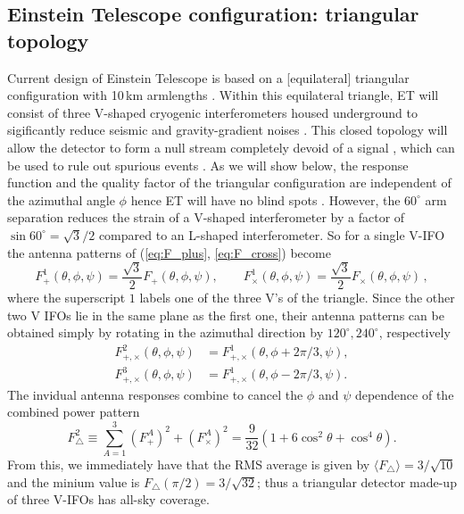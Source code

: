 \documentclass[11pt,a4paper]{article}
\newcommand{\f}{\frac}
\newcommand{\be}{\begin{equation}}
\newcommand{\ee}{\end{equation}}
\begin{document}
\subsection{Einstein Telescope configuration: triangular topology}\label{sec:ET_topo}
Current design of Einstein Telescope is based on a [equilateral] triangular configuration with 10\,km armlengths \cite{ET_doc}.
Within this equilateral triangle, ET will consist of three V-shaped cryogenic interferometers housed underground to
sigificantly reduce seismic and gravity-gradient noises \cite{ET_doc}.
This closed topology will allow the detector to form a null stream completely devoid of a signal \cite{Sathyaprakash:2012jk},
which can be used to rule out spurious events \cite{Wen:2005ui}.
As we will show below, the response function and the quality factor of the triangular configuration are independent of the azimuthal angle $\phi$
hence ET will have no blind spots \cite{Regimbau:2012ir}.
However, the $60^\circ$ arm separation reduces the strain of a V-shaped interferometer by a factor of $\sin 60^\circ=\sqrt{3}/2$ compared
to an L-shaped interferometer. So for a single V-IFO the antenna patterns of (\ref{eq:F_plus}, \ref{eq:F_cross}) become
%
\be
F^1_+(\theta,\phi,\psi)= \f{\sqrt{3}}{2} F_+(\theta,\phi,\psi), \qquad F^1_\times(\theta,\phi,\psi)= \f{\sqrt{3}}{2} F_\times(\theta,\phi,\psi)\label{eq:F1plus_F1cross}\, ,
\ee
%
where the superscript $1$ labels one of the three V's of the triangle.
Since the other two V IFOs lie in the same plane as the first one, their antenna patterns can be obtained simply by rotating in the azimuthal
direction by $120^\circ, 240^\circ$, respectively
%
\begin{align}
 F^2_{+,\times}(\theta,\phi,\psi) &= F^1_{+,\times}(\theta,\phi+2\pi/3,\psi), \label{eq:F2plus_F2cross}\\
 F^3_{+,\times}(\theta,\phi,\psi) &= F^1_{+,\times}(\theta,\phi-2\pi/3,\psi) \label{eq:F3plus_F3cross}.
\end{align}
%
The invidual antenna responses combine to cancel the $\phi$ and $\psi$ dependence of the combined power pattern
%
\be
F^2_\bigtriangleup \equiv \sum_{A=1}^3 \left(F^A_+\right)^2+\left(F^A_\times\right)^2 = \f{9}{32}\left(1+6\cos^2\theta + \cos^4\theta\right). \label{eq:ET_power_pattern}
\ee
%
From this, we immediately have that the RMS average is given by $\langle F_\bigtriangleup\rangle =3/\sqrt{10}$ and the minium value is $F_\bigtriangleup(\pi/2)=3/\sqrt{32}$;
thus a triangular detector made-up of three V-IFOs has all-sky coverage.
\end{document}
